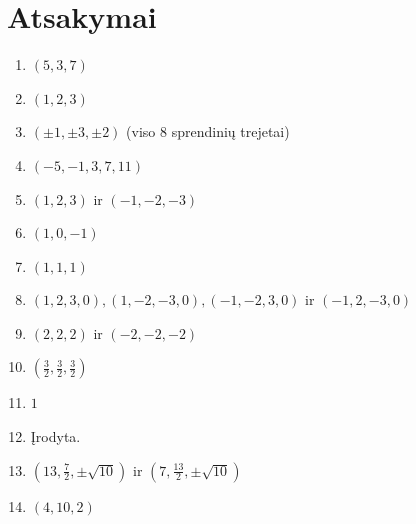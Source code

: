 \documentclass[11pt,a4paper]{scrartcl}
\begin{document}
\newpage
\section{Atsakymai}

\begin{enumerate}
    \item $(5, 3, 7)$
    \item $(1, 2, 3)$
    \item $(\pm 1, \pm 3, \pm 2)$ (viso 8 sprendinių trejetai)
    \item $(-5, -1, 3, 7, 11)$
    \item $(1, 2, 3)$ ir $(-1, -2, -3)$
    \item $(1, 0, -1)$
    \item $(1, 1, 1)$
    \item $(1, 2, 3, 0), (1, -2, -3, 0), (-1, -2, 3, 0)$ ir $(-1, 2, -3, 0)$
    \item $(2, 2, 2)$ ir $(-2, -2, -2)$
    \item $\left(\frac{3}{2}, \frac{3}{2}, \frac{3}{2}\right)$
    \item $1$
    \item Įrodyta.
    \item $\left(13, \frac{7}{2}, \pm\sqrt{10}\right)$ ir $\left(7, \frac{13}{2}, \pm\sqrt{10}\right)$
    \item $(4, 10, 2)$
\end{enumerate}
\end{document}
